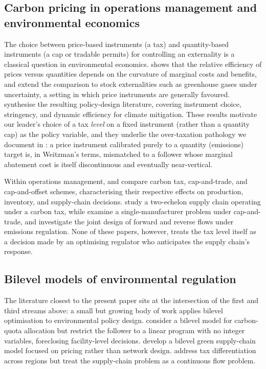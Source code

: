 \subsection{Carbon pricing in operations management and
environmental economics}
\label{sec:lit:carbon}

The choice between price-based instruments (a tax) and quantity-based
instruments (a cap or tradable permits) for controlling an
externality is a classical question in environmental economics.
\citet{weitzman1974} shows that the relative efficiency of prices
versus quantities depends on the curvature of marginal costs and
benefits, and \citet{newellpizer2003} extend the comparison to stock
externalities such as greenhouse gases under uncertainty, a setting
in which price instruments are generally favoured. \citet{aldy2010}
synthesise the resulting policy-design literature, covering
instrument choice, stringency, and dynamic efficiency for climate
mitigation. These results motivate our leader's choice of a tax
\emph{level} on a fixed instrument (rather than a quantity cap) as
the policy variable, and they underlie the over-taxation pathology we
document in : a price instrument calibrated
purely to a quantity (emissions) target is, in Weitzman's terms,
mismatched to a follower whose marginal abatement cost is itself
discontinuous and eventually near-vertical.

Within operations management, \citet{tang2015} and
\citet{benjaafar2013} compare carbon tax, cap-and-trade, and
cap-and-offset schemes, characterising their respective effects on
production, inventory, and supply-chain decisions. \citet{xu2016}
study a two-echelon supply chain operating under a carbon tax, while
\citet{ji2017} examine a single-manufacturer \SCND problem under
cap-and-trade, and \citet{zakeri2015} investigate the joint design of
forward and reverse flows under emissions regulation. None of these
papers, however, treats the tax level itself as a decision made by an
optimising regulator who anticipates the supply chain's response.

\subsection{Bilevel models of environmental regulation}
\label{sec:lit:bilevel_env}

The literature closest to the present paper sits at the intersection
of the first and third streams above: a small but growing body of
work applies bilevel optimisation to environmental policy design.
\citet{zhang2021} consider a bilevel
model for carbon-quota allocation but restrict the follower to a
linear program with no integer variables, foreclosing facility-level
decisions. \citet{he2019} develop a bilevel green supply-chain model
focused on pricing rather than network design.
\citet{cao2020} address tax differentiation across regions but treat
the supply-chain problem as a continuous flow problem.

